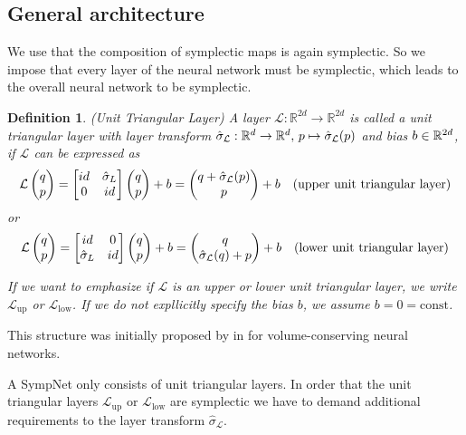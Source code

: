\documentclass[twoside,a4paper]{article}
\newtheorem{definition}{Definition}
\begin{document}

\subsection{General architecture}

We use that the composition of symplectic maps is again symplectic. So we impose that every
layer of the neural network must be symplectic, which leads to the overall neural network
to be symplectic.

\begin{definition}
	(Unit Triangular Layer) A layer $\mathcal{L} : \mathbb{R}^{2d} \to \mathbb{R}^{2d}$ 
	is called a unit triangular layer with layer transform 
	$\hat{\sigma}_{\mathcal{L}} : \mathbb{R}^d \to \mathbb{R}^d,\, p \mapsto \hat{\sigma}_{\mathcal{L}}(p)$
	and bias $b \in \mathbb{R}^{2d}$,
	if $\mathcal{L}$ can be expressed as
	\begin{equation*}
		\mathcal{L} \begin{pmatrix} q \\ p \end{pmatrix} = \begin{bmatrix} id & {\hat{\sigma}_L} \\ 0 & id \end{bmatrix} \begin{pmatrix} q \\ p \end{pmatrix} + b
		= \begin{pmatrix}
			q + \hat{\sigma}_{\mathcal{L}}(p) \\
			p
		\end{pmatrix} + b \quad \text{(upper unit triangular layer)}
	\end{equation*}
	or
	\begin{equation*}
		\mathcal{L} \begin{pmatrix} q \\ p \end{pmatrix} = \begin{bmatrix} id & 0 \\ {\hat{\sigma}_L} & id \end{bmatrix} \begin{pmatrix} q \\ p \end{pmatrix} + b
		= \begin{pmatrix}
			q \\
			\hat{\sigma}_{\mathcal{L}}(q) + p
		\end{pmatrix} + b \quad \text{(lower unit triangular layer)}
	\end{equation*}

	If we want to emphasize if $\mathcal{L}$ is an upper or lower
	unit triangular layer, we write $\mathcal{L}_{\text{up}}$ or $\mathcal{L}_{\text{low}}$.
	If we do not expllicitly specify the bias $b$, we assume $b=0=\text{const}$.
\end{definition}

This structure was initially proposed by \citeauthor{Deco1995} in \cite{Deco1995} 
 for volume-conserving neural networks.

A SympNet only consists of unit triangular layers. In order that the unit triangular layers 
$\mathcal{L}_{\text{up}}$ or $\mathcal{L}_{\text{low}}$ are symplectic 
we have to demand additional requirements to the layer transform $\hat{\sigma}_{\mathcal{L}}$.
\end{document}
